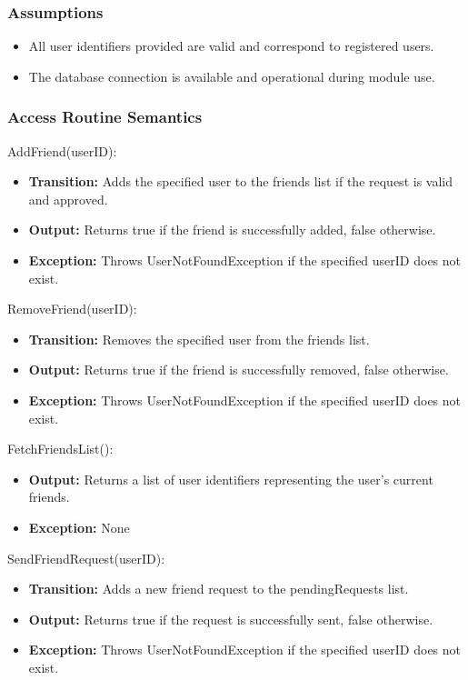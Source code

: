 \documentclass[12pt, titlepage]{article}
\begin{document}
\subsubsection{Assumptions}

\begin{itemize}
  \item All user identifiers provided are valid and correspond to registered users.
  \item The database connection is available and operational during module use.
\end{itemize}

\subsubsection{Access Routine Semantics}

\noindent AddFriend(userID):
\begin{itemize}
  \item \textbf{Transition:} Adds the specified user to the friends list if the request is valid and approved.
  \item \textbf{Output:} Returns true if the friend is successfully added, false otherwise.
  \item \textbf{Exception:} Throws UserNotFoundException if the specified userID does not exist.
\end{itemize}

\noindent RemoveFriend(userID):
\begin{itemize}
  \item \textbf{Transition:} Removes the specified user from the friends list.
  \item \textbf{Output:} Returns true if the friend is successfully removed, false otherwise.
  \item \textbf{Exception:} Throws UserNotFoundException if the specified userID does not exist.
\end{itemize}

\noindent FetchFriendsList():
\begin{itemize}
  \item \textbf{Output:} Returns a list of user identifiers representing the user’s current friends.
  \item \textbf{Exception:} None
\end{itemize}

\noindent SendFriendRequest(userID):
\begin{itemize}
  \item \textbf{Transition:} Adds a new friend request to the pendingRequests list.
  \item \textbf{Output:} Returns true if the request is successfully sent, false otherwise.
  \item \textbf{Exception:} Throws UserNotFoundException if the specified userID does not exist.
\end{itemize}
\end{document}
